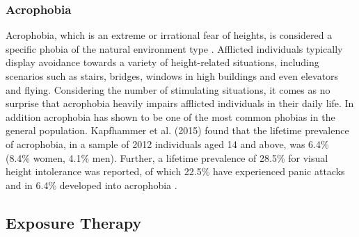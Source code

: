 \subsubsection{Acrophobia}
Acrophobia, which is an extreme or irrational fear of heights, is considered a specific phobia of the natural environment type \cite{DSMIV1994}. Afflicted individuals typically display avoidance towards a variety of height-related situations, including scenarios such as stairs, bridges, windows in high buildings and even elevators and flying. Considering the number of stimulating situations, it comes as no surprise that acrophobia heavily impairs afflicted individuals in their daily life. In addition acrophobia has shown to be one of the most common phobias in the general population. Kapfhammer et al. (2015) found that the lifetime prevalence of acrophobia, in a sample of 2012 individuals aged 14 and above, was 6.4\% (8.4\% women, 4.1\% men). Further, a lifetime prevalence of 28.5\% for visual height intolerance was reported, of which 22.5\% have experienced panic attacks and in 6.4\% developed into acrophobia \cite{Kapfhammer2015}. 





\subsection{Exposure Therapy}

